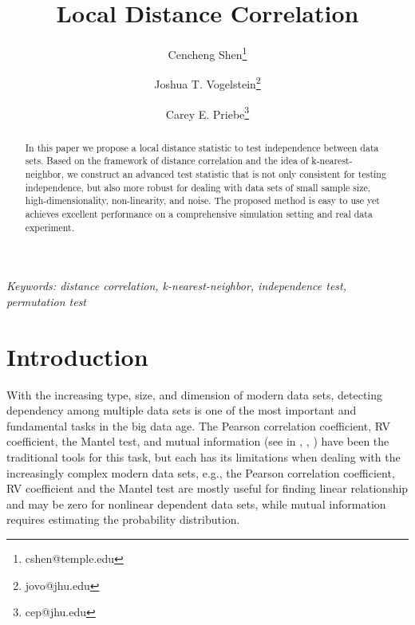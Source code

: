 \documentclass[12pt]{article}
\begin{document}
\def\spacingset#1{\renewcommand{\baselinestretch}%
{#1}\small\normalsize} \spacingset{1}

\title{\bf Local Distance Correlation}
\author[1]{Cencheng Shen\thanks{cshen@temple.edu}}
\author[2]{Joshua T. Vogelstein\thanks{jovo@jhu.edu}}
\author[3]{Carey E. Priebe\thanks{cep@jhu.edu}}
\maketitle

\bigskip
\begin{abstract}
In this paper we propose a local distance statistic to test independence between data sets. Based on the framework of distance correlation and the idea of k-nearest-neighbor, we construct an advanced test statistic that is not only consistent for testing independence, but also more robust for dealing with data sets of small sample size, high-dimensionality, non-linearity, and noise. The proposed method is easy to use yet achieves excellent performance on a comprehensive simulation setting and real data experiment.
\end{abstract}

\noindent%
{\it Keywords: distance correlation, k-nearest-neighbor, independence test, permutation test}  
\vfill

\newpage
\spacingset{1.45} %

\section{Introduction}
With the increasing type, size, and dimension of modern data sets, detecting dependency among multiple data sets is one of the most important and fundamental tasks in the big data age. The Pearson correlation coefficient, RV coefficient, the Mantel test, and mutual information (see in \cite{JosseHolmes2013}, \cite{RobertEscoufier1976}, \cite{Mantel1967}) have been the traditional tools for this task, but each has its limitations when dealing with the increasingly complex modern data sets, e.g., the Pearson correlation coefficient, RV coefficient and the Mantel test are mostly useful for finding linear relationship and may be zero for nonlinear dependent data sets, while mutual information requires estimating the probability distribution. 
\end{document}
